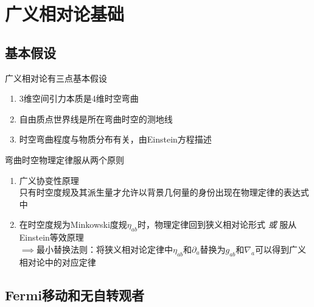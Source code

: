\chapter{广义相对论基础}

\section{基本假设}

广义相对论有三点基本假设
\begin{enumerate}
    \item 3维空间引力本质是4维时空弯曲
    \item 自由质点世界线是所在弯曲时空的测地线
    \item 时空弯曲程度与物质分布有关，由Einstein方程描述
\end{enumerate}

弯曲时空物理定律服从两个原则
\begin{enumerate}
    \item 广义协变性原理\\
    只有时空度规及其派生量才允许以背景几何量的身份出现在物理定律的表达式中
    \item 在时空度规为Minkowski度规$\eta_{ab}$时，物理定律回到狭义相对论形式 \emph{或} 服从Einstein等效原理\\
    $\implies$最小替换法则：将狭义相对论定律中$\eta_{ab}$和$\partial_a$替换为$g_{ab}$和$\nabla_a$可以得到广义相对论中的对应定律
\end{enumerate}

\section{Fermi移动和无自转观者}

